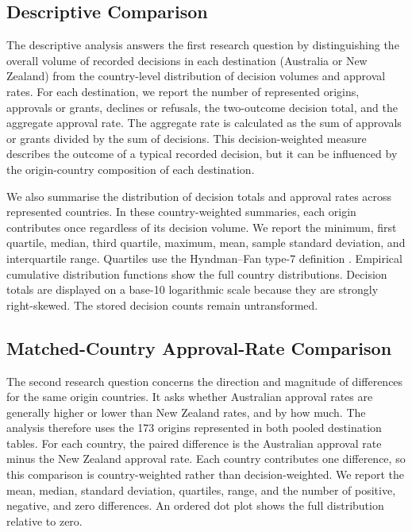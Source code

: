\documentclass[runningheads]{llncs}
\begin{document}
\subsection{Descriptive Comparison}

The descriptive analysis answers the first research question by distinguishing the overall volume of recorded decisions in each destination (Australia or New Zealand) from the country-level distribution of decision volumes and approval rates. For each destination, we report the number of represented origins, approvals or grants, declines or refusals, the two-outcome decision total, and the aggregate approval rate. The aggregate rate is calculated as the sum of approvals or grants divided by the sum of decisions. This decision-weighted measure describes the outcome of a typical recorded decision, but it can be influenced by the origin-country composition of each destination.

We also summarise the distribution of decision totals and approval rates across represented countries. In these country-weighted summaries, each origin contributes once regardless of its decision volume. We report the minimum, first quartile, median, third quartile, maximum, mean, sample standard deviation, and interquartile range. Quartiles use the Hyndman--Fan type-7 definition \cite{HyndmanFan1996}. Empirical cumulative distribution functions show the full country distributions. Decision totals are displayed on a base-10 logarithmic scale because they are strongly right-skewed. The stored decision counts remain untransformed.

\subsection{Matched-Country Approval-Rate Comparison}

The second research question concerns the direction and magnitude of differences for the same origin countries. It asks whether Australian approval rates are generally higher or lower than New Zealand rates, and by how much. The analysis therefore uses the 173 origins represented in both pooled destination tables. For each country, the paired difference is the Australian approval rate minus the New Zealand approval rate. Each country contributes one difference, so this comparison is country-weighted rather than decision-weighted. We report the mean, median, standard deviation, quartiles, range, and the number of positive, negative, and zero differences. An ordered dot plot shows the full distribution relative to zero.
\end{document}
